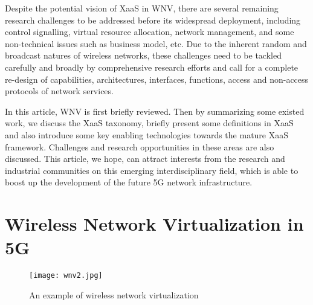 \documentclass[12pt,draftclsnofoot,onecolumn]{IEEEtran}
\begin{document}
Despite the potential vision of XaaS in WNV, there are several
remaining research challenges to be addressed before its
widespread deployment, including control signalling, virtual
resource allocation, network management, and some non-technical
issues such as business model, etc. Due to the inherent random and
broadcast natures of wireless networks, these challenges need to
be tackled carefully and broadly by comprehensive research efforts
and call for a complete re-design of capabilities, architectures,
interfaces, functions, access and non-access protocols of network
services.\par

In this article, WNV is first briefly reviewed. Then by
summarizing some existed work, we discuss the XaaS taxonomy,
briefly present some definitions in XaaS and also introduce some
key enabling technologies towards the mature XaaS framework.
Challenges and research opportunities in these areas are also
discussed. This article, we hope, can attract interests from the
research and industrial communities on this emerging
interdisciplinary field, which is able to boost up the development
of the future 5G network infrastructure.

\section{Wireless Network Virtualization in 5G}

\begin{figure}[t]
\centering
\texttt{[image: wnv2.jpg]}
\caption{An example of wireless network virtualization} \label{fig:example1}
\end{figure}
\end{document}
